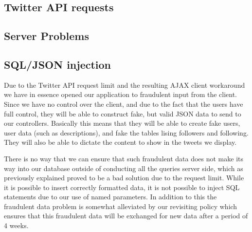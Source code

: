 \subsection{Twitter API requests}

\subsection{Server Problems}

\subsection{SQL/JSON injection}
Due to the Twitter API request limit and the resulting AJAX client workaround we have in essence opened our application to fraudulent input from the client. Since we have no control over the client, and due to the fact that the users have full control, they will be able to construct fake, but valid JSON data to send to our controllers. Basically this means that they will be able to create fake users, user data (such as descriptions), and fake the tables lising followers and following. They will also be able to dictate the content to show in the tweets we display.

There is no way that we can ensure that such fraudulent data does not make its way into our database outside of conducting all the queries server side, which as previously explained proved to be a bad solution due to the request limit. While it is possible to insert correctly formatted data, it is not possible to inject SQL statements due to our use of named parameters. In addition to this the fraudulent data problem is somewhat alleviated by our revisiting policy which ensures that this fraudulent data will be exchanged for new data after a period of 4 weeks.
